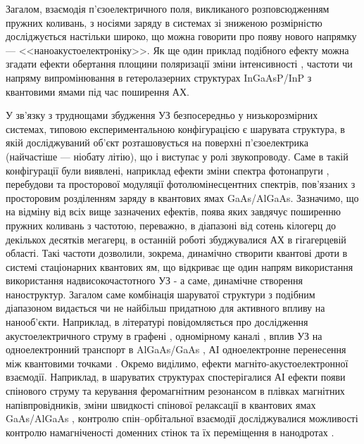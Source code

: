 Загалом, взаємодія п'єзоелектричного поля, викликаного розповсюдженням  пружних коливань, з носіями заряду в системах зі зниженою розмірністю досліджується настільки широко, що можна говорити про появу нового напрямку --- <<наноакустоелектроніку>>.
Як ще один приклад подібного ефекту можна згадати ефекти
обертання площини поляризації \cite{Kulakova:2012SSC,KulakFTP2013}
зміни інтенсивності \cite{Kulakova:09,KulacFTT2009,KulakJETF2007}, частоти \cite{KulakPJETF} чи напряму \cite{KulakPJTF2010} випромінювання в гетеролазерних структурах InGaAsP/InP з квантовими ямами під час поширення АХ.




У зв'язку з труднощами збудження УЗ безпосередньо у низькорозмірних системах, типовою
експериментальною конфігурацією є шарувата структура, в якій досліджуваний об'єкт розташовується на поверхні п'єзоелектрика (найчастіше --- ніобату літію), що і виступає у ролі звукопроводу.
Саме в такій конфігурації були виявлені, наприклад ефекти зміни спектра фотонапруги \cite{KurylJTF09}, перебудови \cite{Kuryliuk2009} та просторової модуляції \cite{US:PL:GaAs} фотолюмінесцентних спектрів, пов'язаних з просторовим розділенням заряду в квантових ямах  GaAs/AlGaAs.
Зазначимо, що на відміну від всіх вище зазначених ефектів, поява яких завдячує поширенню пружних коливань з частотою, переважно, в діапазоні від сотень кілогерц до декількох десятків мегагерц,
в останній роботі збуджувалися АХ в гігагерцевій області.
Такі частоти дозволили, зокрема, динамічно створити квантові дроти в системі стаціонарних квантових ям, що відкриває ще один напрям використання використання надвисокочастотного УЗ - а саме, динамічне створення наноструктур.
Загалом саме комбінація шаруватої структури з подібним діапазоном видається чи не найбільш придатною для активного впливу на нанооб'єкти.
Наприклад, в літературі повідомляється про дослідження акустоелектричного струму в графені \cite{US:graphen,US:grafen2,US:grafen3,US:grafen4}, одномірному каналі \cite{US:1D,NETO2016},
вплив УЗ на одноелектронний транспорт в AlGaAs/GaAs \cite{US:single,US:single2},
АІ одноелектронне перенесення між квантовими точками \cite{US:Nature}.
Окремо виділимо, ефекти магніто-акустоелектронної взаємодії.
 Наприклад, в шаруватих структурах спостерігалися АІ ефекти появи спінового струму \cite{PhysRevLett108:176601} та керування феромагнітним резонансом \cite{PhysRevB90:094401} в плівках магнітних напівпровідників,
зміни  швидкості спінової релаксації в квантових ямах GaAs/AlGaAs \cite{PhysRevB78:153305},
контролю спін--орбітальної взаємодії \cite{Sanada:2011}
досліджувалися можливості контролю намагніченості доменних стінок \cite{LI2014} та їх переміщення в нанодротах \cite{US:nanowire}.


